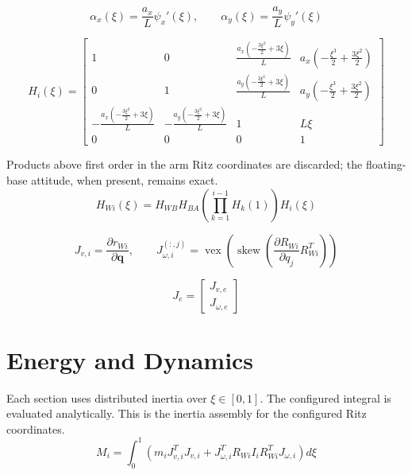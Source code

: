 \documentclass[11pt]{article}
\begin{document}
\begin{equation}
\alpha_x(\xi)=\frac{a_x}{L}\psi_x'(\xi),\qquad \alpha_y(\xi)=\frac{a_y}{L}\psi_y'(\xi)
\end{equation}

\begin{equation}
H_i(\xi)=\begin{bmatrix}1 & 0 & \frac{a_x \left(- \frac{3 \xi^{2}}{2} + 3 \xi\right)}{L} & a_x \left(- \frac{\xi^{3}}{2} + \frac{3 \xi^{2}}{2}\right)\\0 & 1 & \frac{a_y \left(- \frac{3 \xi^{2}}{2} + 3 \xi\right)}{L} & a_y \left(- \frac{\xi^{3}}{2} + \frac{3 \xi^{2}}{2}\right)\\- \frac{a_x \left(- \frac{3 \xi^{2}}{2} + 3 \xi\right)}{L} & - \frac{a_y \left(- \frac{3 \xi^{2}}{2} + 3 \xi\right)}{L} & 1 & L \xi\\0 & 0 & 0 & 1\end{bmatrix}\label{eq:local-transform}
\end{equation}

Products above first order in the arm Ritz coordinates are discarded; the floating-base attitude, when present, remains exact.
\begin{equation}
H_{Wi}(\xi)=H_{WB}H_{BA}\left(\prod_{k=1}^{i-1}H_k(1)\right)H_i(\xi)
\end{equation}

\begin{equation}
J_{v,i}=\frac{\partial r_{Wi}}{\partial\boldsymbol q},\qquad J_{\omega,i}^{(:,j)}=\operatorname{vex}\!\left(\operatorname{skew}\!\left(\frac{\partial R_{Wi}}{\partial q_j}R_{Wi}^{T}\right)\right)
\end{equation}

\begin{equation}
J_e=\begin{bmatrix}J_{v,e}\\J_{\omega,e}\end{bmatrix}
\end{equation}


\section{Energy and Dynamics}
Each section uses distributed inertia over $\xi\in[0,1]$. The configured integral is evaluated analytically. This is the inertia assembly for the configured Ritz coordinates.
\begin{equation}
M_i=\int_0^1\!\left(m_iJ_{v,i}^{T}J_{v,i}+J_{\omega,i}^{T}R_{Wi}I_iR_{Wi}^{T}J_{\omega,i}\right)d\xi
\end{equation}
\end{document}
